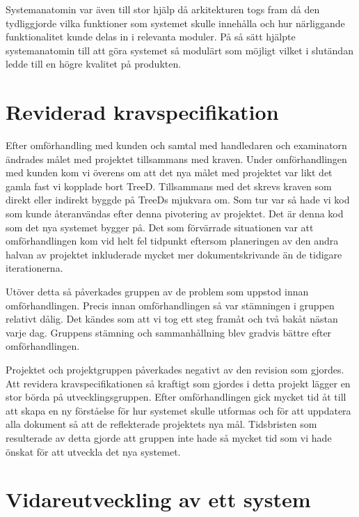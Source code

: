 Systemanatomin var även till stor hjälp då arkitekturen togs fram då den tydliggjorde vilka funktioner som systemet skulle innehålla och hur närliggande funktionalitet kunde delas in i relevanta moduler. På så sätt hjälpte systemanatomin till att göra systemet så modulärt som möjligt vilket i slutändan ledde till en högre kvalitet på produkten.

\section{Reviderad kravspecifikation}
Efter omförhandling med kunden och samtal med handledaren och examinatorn ändrades målet med projektet tillsammans med kraven. Under omförhandlingen med kunden kom vi överens om att det nya målet med projektet var likt det gamla fast vi kopplade bort TreeD. Tillsammans med det skrevs kraven som direkt eller indirekt byggde på TreeDs mjukvara om. Som tur var så hade vi kod som kunde återanvändas efter denna pivotering av projektet. Det är denna kod som det nya systemet bygger på. Det som förvärrade situationen var att omförhandlingen kom vid helt fel tidpunkt eftersom planeringen av den andra halvan av projektet inkluderade mycket mer dokumentskrivande än de tidigare iterationerna.

Utöver detta så påverkades gruppen av de problem som uppstod innan omförhandlingen. Precis innan omförhandlingen så var stämningen i gruppen relativt dålig. Det kändes som att vi tog ett steg framåt och två bakåt nästan varje dag. Gruppens stämning och sammanhållning blev gradvis bättre efter omförhandlingen.

Projektet och projektgruppen påverkades negativt av den revision som gjordes. Att revidera kravspecifikationen så kraftigt som gjordes i detta projekt lägger en stor börda på utvecklingsgruppen. Efter omförhandlingen gick mycket tid åt till att skapa en ny förståelse för hur systemet skulle utformas och för att uppdatera alla dokument så att de reflekterade projektets nya mål. Tidsbristen som resulterade av detta gjorde att gruppen inte hade så mycket tid som vi hade önskat för att utveckla det nya systemet. 

\section{Vidareutveckling av ett system}

